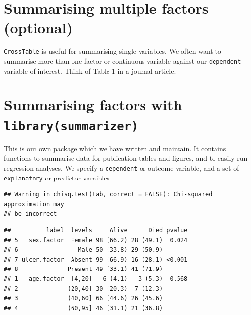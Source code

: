 \documentclass[]{book}
\makeatletter
\newenvironment{Shaded}{\begin{snugshade}}{\end{snugshade}}
\newcommand{\KeywordTok}[1]{\textcolor[rgb]{0.13,0.29,0.53}{\textbf{#1}}}
\newcommand{\DataTypeTok}[1]{\textcolor[rgb]{0.13,0.29,0.53}{#1}}
\newcommand{\StringTok}[1]{\textcolor[rgb]{0.31,0.60,0.02}{#1}}
\newcommand{\OtherTok}[1]{\textcolor[rgb]{0.56,0.35,0.01}{#1}}
\newcommand{\OperatorTok}[1]{\textcolor[rgb]{0.81,0.36,0.00}{\textbf{#1}}}
\newcommand{\NormalTok}[1]{#1}
\newenvironment{kframe}{%
\medskip{}
\setlength{\fboxsep}{.8em}
 \def\at@end@of@kframe{}%
 \ifinner\ifhmode%
  \def\at@end@of@kframe{\end{minipage}}%
  \begin{minipage}{\columnwidth}%
 \fi\fi%
 \def\FrameCommand##1{\hskip\@totalleftmargin \hskip-\fboxsep
 \colorbox{shadecolor}{##1}\hskip-\fboxsep
     \hskip-\linewidth \hskip-\@totalleftmargin \hskip\columnwidth}%
 \MakeFramed {\advance\hsize-\width
   \@totalleftmargin\z@ \linewidth\hsize
   \@setminipage}}%
 {\par\unskip\endMakeFramed%
 \at@end@of@kframe}
\renewenvironment{Shaded}{\begin{kframe}}{\end{kframe}}
\makeatother
\begin{document}
\section{Summarising multiple factors
(optional)}\label{summarising-multiple-factors-optional}

\texttt{CrossTable} is useful for summarising single variables. We often
want to summarise more than one factor or continuous variable against
our \texttt{dependent} variable of interest. Think of Table 1 in a
journal article.

\section{\texorpdfstring{Summarising factors with
\texttt{library(summarizer)}}{Summarising factors with library(summarizer)}}\label{summarising-factors-with-librarysummarizer}

This is our own package which we have written and maintain. It contains
functions to summarise data for publication tables and figures, and to
easily run regression analyses. We specify a \texttt{dependent} or
outcome variable, and a set of \texttt{explanatory} or predictor
varaibles.

\begin{Shaded}
\end{Shaded}

\begin{verbatim}
## Warning in chisq.test(tab, correct = FALSE): Chi-squared approximation may
## be incorrect
\end{verbatim}

\begin{verbatim}
##          label  levels     Alive      Died pvalue
## 5   sex.factor  Female 98 (66.2) 28 (49.1)  0.024
## 6                 Male 50 (33.8) 29 (50.9)       
## 7 ulcer.factor  Absent 99 (66.9) 16 (28.1) <0.001
## 8              Present 49 (33.1) 41 (71.9)       
## 1   age.factor  [4,20]   6 (4.1)   3 (5.3)  0.568
## 2              (20,40] 30 (20.3)  7 (12.3)       
## 3              (40,60] 66 (44.6) 26 (45.6)       
## 4              (60,95] 46 (31.1) 21 (36.8)
\end{verbatim}
\end{document}
